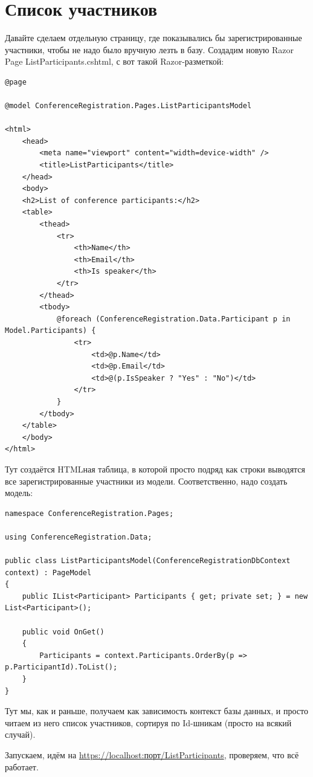 \documentclass{../../text-style}
\begin{document}
\section{Список участников}

Давайте сделаем отдельную страницу, где показывались бы зарегистрированные участники, чтобы не надо было вручную лезть в базу. Создадим новую Razor Page ListParticipants.cshtml, с вот такой Razor-разметкой:

\begin{verbatim}
@page

@model ConferenceRegistration.Pages.ListParticipantsModel

<html>
    <head>
        <meta name="viewport" content="width=device-width" />
        <title>ListParticipants</title>
    </head>
    <body>
    <h2>List of conference participants:</h2>
    <table>
        <thead>
            <tr>
                <th>Name</th>
                <th>Email</th>
                <th>Is speaker</th>
            </tr>
        </thead>
        <tbody>
            @foreach (ConferenceRegistration.Data.Participant p in Model.Participants) {
                <tr>
                    <td>@p.Name</td>
                    <td>@p.Email</td>
                    <td>@(p.IsSpeaker ? "Yes" : "No")</td>
                </tr>
            }
        </tbody>
    </table>
    </body>
</html>
\end{verbatim}

Тут создаётся HTMLная таблица, в которой просто подряд как строки выводятся все зарегистрированные участники из модели. Соответственно, надо создать модель:

\begin{verbatim}
namespace ConferenceRegistration.Pages;

using ConferenceRegistration.Data;

public class ListParticipantsModel(ConferenceRegistrationDbContext context) : PageModel
{
    public IList<Participant> Participants { get; private set; } = new List<Participant>();

    public void OnGet()
    {
        Participants = context.Participants.OrderBy(p => p.ParticipantId).ToList();
    }
}
\end{verbatim}

Тут мы, как и раньше, получаем как зависимость контекст базы данных, и просто читаем из него список участников, сортируя по Id-шникам (просто на всякий случай).

Запускаем, идём на \url{https://localhost:порт/ListParticipants}, проверяем, что всё работает.
\end{document}

